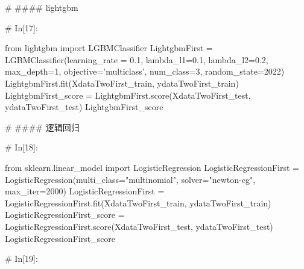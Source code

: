 \documentclass{MathorCupmodeling}
\begin{document}
\begin{python}
# #### lightgbm

# In[17]:


from lightgbm import LGBMClassifier
LightgbmFirst = LGBMClassifier(learning_rate = 0.1,
                               lambda_l1=0.1,
                               lambda_l2=0.2,
                               max_depth=1,
                               objective='multiclass',
                               num_class=3,
                               random_state=2022)
LightgbmFirst.fit(XdataTwoFirst_train, ydataTwoFirst_train)
LightgbmFirst_score = LightgbmFirst.score(XdataTwoFirst_test, ydataTwoFirst_test)
LightgbmFirst_score


# #### 逻辑回归

# In[18]:


from sklearn.linear_model import LogisticRegression
LogisticRegressionFirst = LogisticRegression(multi_class="multinomial", solver="newton-cg", max_iter=2000)
LogisticRegressionFirst = LogisticRegressionFirst.fit(XdataTwoFirst_train, ydataTwoFirst_train)
LogisticRegressionFirst_score = LogisticRegressionFirst.score(XdataTwoFirst_test, ydataTwoFirst_test)
LogisticRegressionFirst_score


# In[19]:



\end{python}
\end{document}

